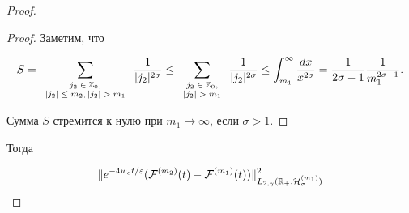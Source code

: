 \begin{proof}



\smallskip



\begin{proof} Заметим, что 

\begin{equation}

S=\sum_{

\scriptsize

\begin{array}{c} 

j_2\in \mathbb Z_0, \\

|j_2|\le m_2, |j_2|>  m_1

\end{array}

}\frac{1}{|j_2|^{2\sigma}}\le \sum_{ 

\scriptsize

\begin{array}{c} 

j_2\in \mathbb Z_0, \\ 

|j_2|> m_1

\end{array}

}\frac{1}{|j_2|^{2\sigma}}\le \int_{m_1}^\infty

\frac{dx}{x^{2\sigma}}=\frac{1}{2\sigma-1}\frac{1}{m_1^{2\sigma-1}}.

\label{duh:sumest}

\end{equation}

Сумма $S$ стремится к нулю при $m_1\to \infty$, если $\sigma>1$.

\end{proof}



\smallskip



Тогда

\begin{equation}

\| e^{-4w_e t/\varepsilon}( {\cal F}^{(m_2)}(t)

-{\cal F}^{(m_1)}(t))\|^2_{L_{2,\gamma}(\mathbb R_{+},{\cal H}^{(m_1)}_{\sigma})}


\end{equation}
\end{proof}
